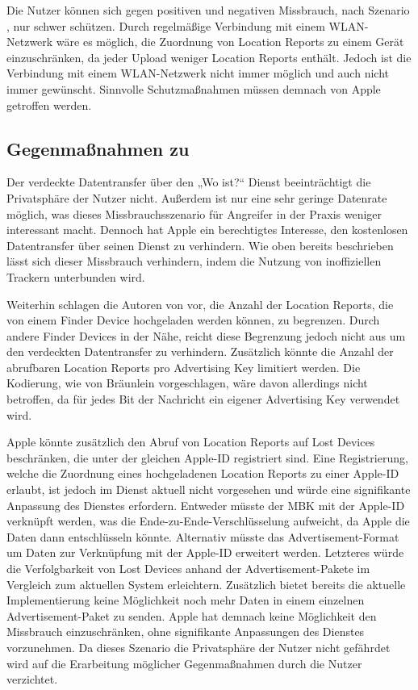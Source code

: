 Die Nutzer können sich gegen positiven und negativen Missbrauch, nach Szenario , nur schwer schützen.
Durch regelmäßige Verbindung mit einem WLAN-Netzwerk wäre es möglich, die Zuordnung von Location Reports zu einem Gerät einzuschränken, da jeder Upload weniger Location Reports enthält.
Jedoch ist die Verbindung mit einem WLAN-Netzwerk nicht immer möglich und auch nicht immer gewünscht.
Sinnvolle Schutzmaßnahmen müssen demnach von Apple getroffen werden.

\subsection{Gegenmaßnahmen zu }
Der verdeckte Datentransfer über den „Wo ist?“ Dienst beeinträchtigt die Privatsphäre der Nutzer nicht.
Außerdem ist nur eine sehr geringe Datenrate möglich, was dieses Missbrauchsszenario für Angreifer in der Praxis weniger interessant macht.
Dennoch hat Apple ein berechtigtes Interesse, den kostenlosen Datentransfer über seinen Dienst zu verhindern.
Wie oben bereits beschrieben lässt sich dieser Missbrauch verhindern, indem die Nutzung von inoffiziellen Trackern unterbunden wird.

Weiterhin schlagen die Autoren von \cite{Tonetto_FindMy} vor, die Anzahl der Location Reports, die von einem Finder Device hochgeladen werden können, zu begrenzen.
Durch andere Finder Devices in der Nähe, reicht diese Begrenzung jedoch nicht aus um den verdeckten Datentransfer zu verhindern.
Zusätzlich könnte die Anzahl der abrufbaren Location Reports pro Advertising Key limitiert werden.
Die Kodierung, wie von Bräunlein \cite{braeunlein_sendmy} vorgeschlagen, wäre davon allerdings nicht betroffen, da für jedes Bit der Nachricht ein eigener Advertising Key verwendet wird.

Apple könnte zusätzlich den Abruf von Location Reports auf Lost Devices beschränken, die unter der gleichen Apple-ID registriert sind.
Eine Registrierung, welche die Zuordnung eines hochgeladenen Location Reports zu einer Apple-ID erlaubt, ist jedoch im Dienst aktuell nicht vorgesehen und würde eine signifikante Anpassung des Dienstes erfordern.
Entweder müsste der \ac{MBK} mit der Apple-ID verknüpft werden, was die Ende-zu-Ende-Verschlüsselung aufweicht, da Apple die Daten dann entschlüsseln könnte.
Alternativ müsste das Advertisement-Format um Daten zur Verknüpfung mit der Apple-ID erweitert werden.
Letzteres würde die Verfolgbarkeit von Lost Devices anhand der Advertisement-Pakete im Vergleich zum aktuellen System erleichtern.
Zusätzlich bietet bereits die aktuelle Implementierung keine Möglichkeit noch mehr Daten in einem einzelnen Advertisement-Paket zu senden.
Apple hat demnach keine Möglichkeit den Missbrauch einzuschränken, ohne signifikante Anpassungen des Dienstes vorzunehmen.
Da dieses Szenario die Privatsphäre der Nutzer nicht gefährdet wird auf die Erarbeitung möglicher Gegenmaßnahmen durch die Nutzer verzichtet.

